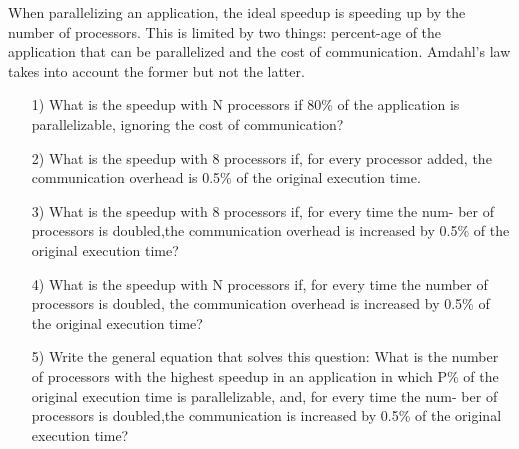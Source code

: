 \begin{exercise}[]{When parallelizing an application, the ideal speedup is speeding up by the number of processors. This is limited by two things: percent-age of the application that can be parallelized and the cost of communication. Amdahl's law takes into account the former but not the latter.
  \begin{itemize}
    \item [1)]
  What is the speedup with N processors if 80\% of the application
  is parallelizable, ignoring the cost of communication?
    \item [2)]
  What is the speedup with 8 processors if, for every processor
  added, the communication overhead is 0.5\% of the original execution time.
    \item [3)]
    What is the speedup with 8 processors if, for every time the num-
  ber of processors is doubled,the communication overhead is increased by
  0.5\% of the original execution time?
    \item [4)]
    What is the speedup with N processors if, for every time the
  number of processors is doubled, the communication overhead is increased
  by 0.5\% of the original execution time?
    \item [5)]
    Write the general equation that solves this question: What is the
  number of processors with the highest speedup in an application in which P\%
  of the original execution time is parallelizable, and, for every time the num-
  ber of processors is doubled,the communication is increased by 0.5\% of the
  original execution time?
  

\end{itemize}}
\end{exercise}
